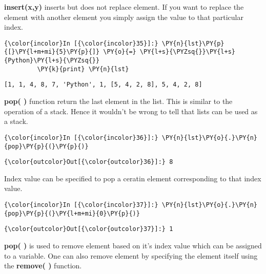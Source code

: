     \textbf{insert(x,y)} inserts but does not replace element. If you want
to replace the element with another element you simply assign the value
to that particular index.

    \begin{Verbatim}[commandchars=\\\{\}]
{\color{incolor}In [{\color{incolor}35}]:} \PY{n}{lst}\PY{p}{[}\PY{l+m+mi}{5}\PY{p}{]} \PY{o}{=} \PY{l+s}{\PYZsq{}}\PY{l+s}{Python}\PY{l+s}{\PYZsq{}}
         \PY{k}{print} \PY{n}{lst}
\end{Verbatim}

    \begin{Verbatim}[commandchars=\\\{\}]
[1, 1, 4, 8, 7, 'Python', 1, [5, 4, 2, 8], 5, 4, 2, 8]
    \end{Verbatim}

    \textbf{pop( )} function return the last element in the list. This is
similar to the operation of a stack. Hence it wouldn't be wrong to tell
that lists can be used as a stack.

    \begin{Verbatim}[commandchars=\\\{\}]
{\color{incolor}In [{\color{incolor}36}]:} \PY{n}{lst}\PY{o}{.}\PY{n}{pop}\PY{p}{(}\PY{p}{)}
\end{Verbatim}

            \begin{Verbatim}[commandchars=\\\{\}]
{\color{outcolor}Out[{\color{outcolor}36}]:} 8
\end{Verbatim}
        
    Index value can be specified to pop a ceratin element corresponding to
that index value.

    \begin{Verbatim}[commandchars=\\\{\}]
{\color{incolor}In [{\color{incolor}37}]:} \PY{n}{lst}\PY{o}{.}\PY{n}{pop}\PY{p}{(}\PY{l+m+mi}{0}\PY{p}{)}
\end{Verbatim}

            \begin{Verbatim}[commandchars=\\\{\}]
{\color{outcolor}Out[{\color{outcolor}37}]:} 1
\end{Verbatim}
        
    \textbf{pop( )} is used to remove element based on it's index value
which can be assigned to a variable. One can also remove element by
specifying the element itself using the \textbf{remove( )} function.

